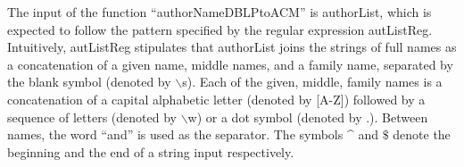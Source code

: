 The input of the function ``authorNameDBLPtoACM'' is {\sf authorList}, which is expected to follow the pattern specified by the regular expression {\sf autListReg}. Intuitively, {\sf autListReg} stipulates that {\sf authorList} %
joins the strings of full names %
as a concatenation of a given name, middle names, and a family name, separated by the blank symbol (denoted by $\backslash$s). Each of the given, middle, family names is a concatenation of a capital alphabetic letter (denoted by [A-Z]) followed by a sequence of letters (denoted by $\backslash$w) or a dot symbol (denoted by $.$). Between names, the word ``and'' is used as the separator.
The symbols \^{} and $\$$ denote the beginning and the end of a string input respectively.


